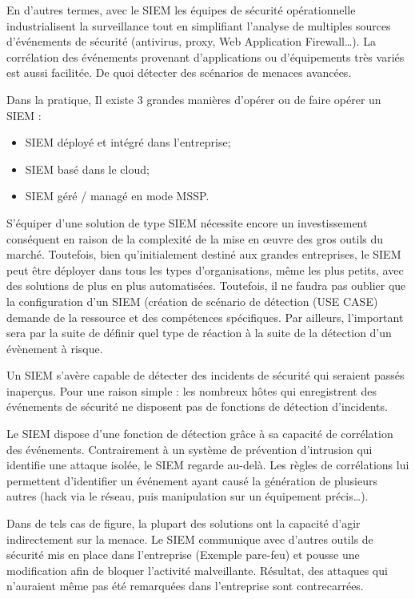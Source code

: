 En d’autres termes, avec le SIEM les équipes de sécurité opérationnelle industrialisent la surveillance tout en simplifiant l’analyse de multiples sources d’événements de sécurité (antivirus, proxy, Web Application Firewall…). La corrélation des événements provenant d’applications ou d’équipements très variés est aussi facilitée. De quoi détecter des scénarios de menaces avancées.

Dans la pratique, Il existe 3 grandes manières d'opérer ou de faire opérer un SIEM :

\begin{itemize}
  \item SIEM  déployé et intégré dans l'entreprise;
  \item SIEM basé dans le cloud;
  \item SIEM géré / managé en mode MSSP.
\end{itemize}

S'équiper d’une solution de type SIEM nécessite encore un investissement conséquent en raison de la complexité de la mise en œuvre des gros outils du marché. Toutefois, bien qu’initialement destiné aux grandes entreprises, le SIEM peut être déployer dans tous les types d’organisations, même les plus petits, avec des solutions de plus en plus automatisées. Toutefois, il ne faudra pas oublier que la configuration d'un SIEM (création de scénario de détection (USE CASE) demande de la ressource et des compétences spécifiques.
Par ailleurs, l'important sera par la suite de définir quel type de réaction à la suite de la détection d'un évènement à risque.


Un SIEM s’avère capable de détecter des incidents de sécurité qui seraient passés inaperçus. Pour une raison simple : les nombreux hôtes qui enregistrent des événements de sécurité ne disposent pas de fonctions de détection d’incidents.

Le SIEM dispose d'une fonction de détection grâce à sa capacité de corrélation des événements. Contrairement à un système de prévention d’intrusion qui identifie une attaque isolée, le SIEM regarde au-delà. Les règles de corrélations lui permettent d’identifier un événement ayant causé la génération de plusieurs autres (hack via le réseau, puis manipulation sur un équipement précis…).

Dans de tels cas de figure, la plupart des solutions ont la capacité d’agir indirectement sur la menace. Le SIEM communique avec d’autres outils de sécurité mis en place dans l’entreprise (Exemple pare-feu) et pousse une modification afin de bloquer l’activité malveillante. Résultat, des attaques qui n’auraient même pas été remarquées dans l’entreprise sont contrecarrées.

